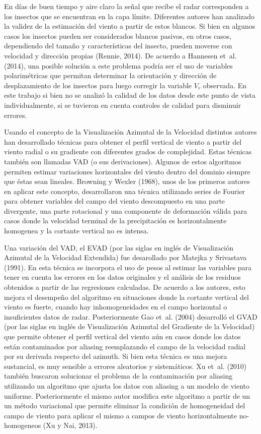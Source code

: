 \documentclass[12pt,spanish,oneside, a4paper]{book}
\begin{document}
En días de buen tiempo y aire claro la señal que recibe el radar
corresponden a los insectos que se encuentran en la capa límite.
Diferentes autores han analizado la validez de la estimación del viento
a partir de estos blancos. Si bien en algunos casos los insectos pueden
ser considerados blancos pasivos, en otros casos, dependiendo del tamaño
y características del insecto, pueden moverse con velocidad y dirección
propias (Rennie, 2014). De acuerdo a Hannesen et~al. (2014), una posible
solución a este problema podría ser el uso de variables polarimétricas
que permitan determinar la orientación y dirección de desplazamiento de
los insectos para luego corregir la variable \(V_r\) observada. En este
trabajo si bien no se analizó la calidad de los datos desde este punto
de vista individualmente, si se tuvieron en cuenta controles de calidad
para disminuir errores.

Usando el concepto de la Visualización Azimutal de la Velocidad
distintos autores han desarrollado técnicas para obtener el perfil
vertical de viento a partir del viento radial o su gradiente con
diferentes grados de complejidad. Estas técnicas también son llamadas
VAD (o sus derivaciones). Algunos de estos algoritmos permiten estimar
variaciones horizontales del viento dentro del dominio siempre que éstas
sean lineales. Browning y Wexler (1968), unos de los primeros autores en
aplicar este concepto, desarrollaron una técnica utilizando series de
Fourier para obtener variables del campo del viento descompuesto en una
parte divergente, una parte rotacional y una componente de deformación
válida para casos donde la velocidad terminal de la precipitación es
horizontalmente homogenea y la cortante vertical no es intensa.

Una variación del VAD, el EVAD (por las siglas en inglés de
Visualización Azimutal de la Velocidad Extendida) fue desarollado por
Matejka y Srivastava (1991). En esta técnica se incorpora el uso de
pesos al estimar las variables para tener en cuenta los errores en los
datos originales y el análisis de los residuos obtenidos a partir de las
regresiones calculadas. De acuerdo a los autores, esto mejora el
desempeño del algoritmo en situaciones donde la cortante vertical del
viento es fuerte, cuando hay inhomogeneidades en el campo horizontal o
insuficientes datos de radar. Posteriormente Gao et~al. (2004)
desarrolló el GVAD (por las siglas en inglés de Visualización Azimutal
del Gradiente de la Velocidad) que permite obtener el perfil vertical
del viento aún en casos donde los datos están contaminados por aliasing
reemplazando el campo de la velocidad radial por su derivada respecto
del azimuth. Si bien esta técnica es una mejora sustancial, es muy
sensible a errores aleatorios y sistemáticos. Xu et~al. (2010) también
buscaron solucionar el problema de la contaminación por aliasing
utilizando un algoritmo que ajusta los datos con aliasing a un modelo de
viento uniforme. Posteriormente el mismo autor modifica este algoritmo a
partir de un un método variacional que permite eliminar la condición de
homogeneidad del campo de viento para aplicar el mismo a campos de
viento horizontalmente no-homogeneos (Xu y Nai, 2013).
\end{document}

